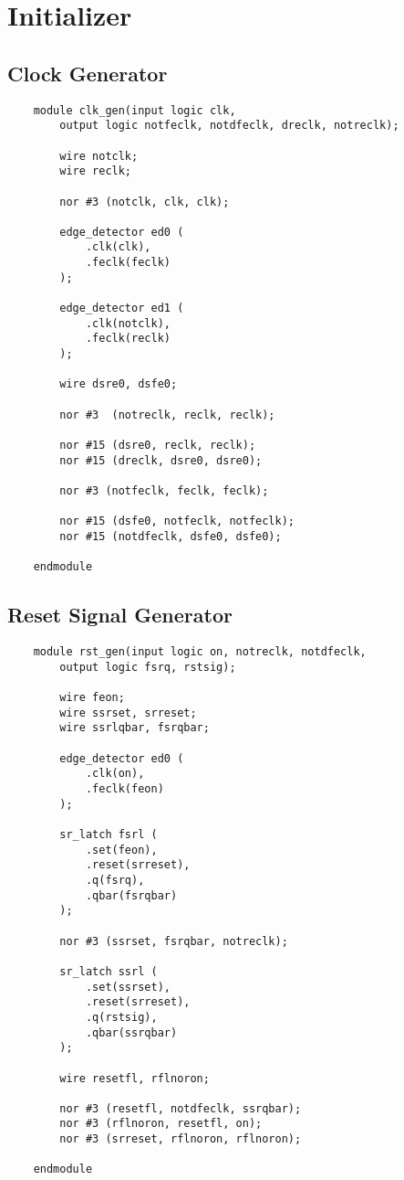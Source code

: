 \documentclass[../main]{subfiles}
\begin{document}
\section{Initializer}

\subsection {Clock Generator}

\begin{verbatim}
    module clk_gen(input logic clk,
        output logic notfeclk, notdfeclk, dreclk, notreclk);

        wire notclk;
        wire reclk;

        nor #3 (notclk, clk, clk);

        edge_detector ed0 (
            .clk(clk),
            .feclk(feclk)
        );

        edge_detector ed1 (
            .clk(notclk),
            .feclk(reclk)
        );

        wire dsre0, dsfe0;

        nor #3  (notreclk, reclk, reclk);

        nor #15 (dsre0, reclk, reclk);
        nor #15 (dreclk, dsre0, dsre0);

        nor #3 (notfeclk, feclk, feclk);

        nor #15 (dsfe0, notfeclk, notfeclk);
        nor #15 (notdfeclk, dsfe0, dsfe0);

    endmodule
\end{verbatim}

\subsection {Reset Signal Generator}

\begin{verbatim}
    module rst_gen(input logic on, notreclk, notdfeclk,
        output logic fsrq, rstsig);

        wire feon;
        wire ssrset, srreset;
        wire ssrlqbar, fsrqbar;

        edge_detector ed0 (
            .clk(on),
            .feclk(feon)
        );

        sr_latch fsrl (
            .set(feon),
            .reset(srreset),
            .q(fsrq),
            .qbar(fsrqbar)
        );

        nor #3 (ssrset, fsrqbar, notreclk);

        sr_latch ssrl (
            .set(ssrset),
            .reset(srreset),
            .q(rstsig),
            .qbar(ssrqbar)
        );

        wire resetfl, rflnoron;

        nor #3 (resetfl, notdfeclk, ssrqbar);
        nor #3 (rflnoron, resetfl, on);
        nor #3 (srreset, rflnoron, rflnoron);

    endmodule
\end{verbatim}
\end{document}
